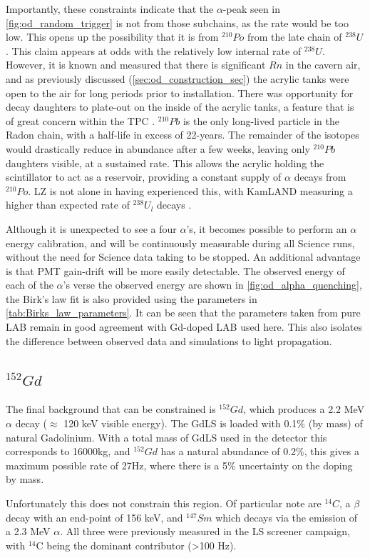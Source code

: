 \par
Importantly, these constraints indicate that the $\alpha$-peak seen in \autoref{fig:od_random_trigger} is not from those subchains, as the rate would be too low.
This opens up the possibility that it is from ${}^{210}Po$ from the late chain of ${}^{238}U$. 
This claim appears at odds with the relatively low internal rate of ${}^{238}U$.
However, it is known and measured that there is significant $Rn$ in the cavern air, and as previously discussed (\autoref{sec:od_construction_sec}) the acrylic tanks were open to the air for long periods prior to installation.
There was opportunity for decay daughters to plate-out on the inside of the acrylic tanks, a feature that is of great concern within the TPC \cite{radon_plateout_ref}.
${}^{210}Pb$ is the only long-lived particle in the Radon chain, with a half-life in excess of 22-years. 
The remainder of the isotopes would drastically reduce in abundance after a few weeks, leaving only ${}^{210}Pb$ daughters visible, at a sustained rate.
This allows the acrylic holding the scintillator to act as a reservoir, providing a constant supply of $\alpha$ decays from ${}^{210}Po$.
LZ is not alone in having experienced this, with KamLAND measuring a higher than expected rate of ${}^{238}U_l$ decays \cite{KamLAND_LS_contaminants_ref}.

\par
Although it is unexpected to see a four $\alpha$'s, it becomes possible to perform an $\alpha$ energy calibration, and will be continuously measurable during all Science runs, without the need for Science data taking to be stopped.
An additional advantage is that PMT gain-drift will be more easily detectable.
The observed energy of each of the $\alpha$'s verse the observed energy are shown in \autoref{fig:od_alpha_quenching}, the Birk's law fit is also provided using the parameters in \autoref{tab:Birks_law_parameters}.
It can be seen that the parameters taken from pure LAB remain in good agreement with Gd-doped LAB used here.
This also isolates the difference between observed data and simulations to light propagation.



\subsection{${}^{152}Gd$}
\par
The final background that can be constrained is ${}^{152}Gd$, which produces a 2.2 MeV $\alpha$ decay ($\approx$ 120 keV visible energy).
The GdLS is loaded with 0.1\% (by mass) of natural Gadolinium.
With a total mass of GdLS used in the detector this corresponds to 16000kg, and ${}^{152}Gd$ has a natural abundance of 0.2\%, this gives a maximum possible rate of 27Hz, where there is a 5\% uncertainty on the doping by mass.
\par
Unfortunately this does not constrain this region.
Of particular note are ${}^{14}C$, a $\beta$ decay with an end-point of 156 keV, and ${}^{147}Sm$ which decays via the emission of a 2.3 MeV $\alpha$.
All three were previously measured in the LS screener campaign, with ${}^{14}$C being the dominant contributor (>100 Hz).

